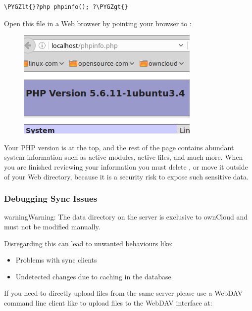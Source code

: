 \documentclass[letterpaper,10pt,english]{sphinxmanual}
\def\PYGZlt{\char`\<}
\def\PYGZgt{\char`\>}
\begin{document}
\begin{Verbatim}[commandchars=\\\{\}]
\PYGZlt{}?php phpinfo(); ?\PYGZgt{}
\end{Verbatim}

Open this file in a Web browser by pointing your browser to
:
\begin{figure}[htbp]
\centering

\includegraphics{phpinfo.png}
\end{figure}

Your PHP version is at the top, and the rest of the page contains abundant
system information such as active modules, active  files, and much more.
When you are finished reviewing your information you must delete
, or move it outside of your Web directory, because it is a
security risk to expose such sensitive data.


\subsubsection{Debugging Sync Issues}
\label{issues/general_troubleshooting:debugging-sync-issues}
\begin{notice}{warning}{Warning:}
The data directory on the server is exclusive to ownCloud and must
not be modified manually.
\end{notice}

Disregarding this can lead to unwanted behaviours like:
\begin{itemize}
\item {} 
Problems with sync clients

\item {} 
Undetected changes due to caching in the database

\end{itemize}

If you need to directly upload files from the same server please use a WebDAV
command line client like  to upload files to the WebDAV interface at:
\end{document}
